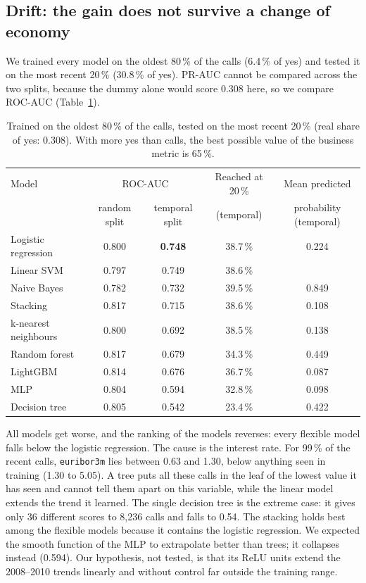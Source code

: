 \documentclass[11pt,a4paper]{article}
\begin{document}
\subsection{Drift: the gain does not survive a change of economy}
We trained every model on the oldest 80\,\% of the calls (6.4\,\% of yes) and tested it on the most recent 20\,\%
(30.8\,\% of yes). PR-AUC cannot be compared across the two splits, because the dummy alone would score 0.308 here,
so we compare ROC-AUC (Table~\ref{tab:temporal}).

\begin{table}[H]
\centering\small
\begin{tabular}{l c c c c}
\toprule
Model & \multicolumn{2}{c}{ROC-AUC} & Reached at 20\,\% & Mean predicted \\
 & random split & temporal split & (temporal) & probability (temporal) \\
\midrule
Logistic regression & 0.800 & \textbf{0.748} & 38.7\,\% & 0.224 \\
Linear SVM & 0.797 & 0.749 & 38.6\,\% & \\
Naive Bayes & 0.782 & 0.732 & 39.5\,\% & 0.849 \\
Stacking & 0.817 & 0.715 & 38.6\,\% & 0.108 \\
k-nearest neighbours & 0.800 & 0.692 & 38.5\,\% & 0.138 \\
Random forest & 0.817 & 0.679 & 34.3\,\% & 0.449 \\
LightGBM & 0.814 & 0.676 & 36.7\,\% & 0.087 \\
MLP & 0.804 & 0.594 & 32.8\,\% & 0.098 \\
Decision tree & 0.805 & 0.542 & 23.4\,\% & 0.422 \\
\bottomrule
\end{tabular}
\caption{Trained on the oldest 80\,\% of the calls, tested on the most recent 20\,\% (real share of yes: 0.308).
With more yes than calls, the best possible value of the business metric is 65\,\%.}
\label{tab:temporal}
\end{table}

All models get worse, and the ranking of the models reverses: every flexible model falls below the logistic
regression. The cause is the interest rate. For 99\,\% of the recent calls, \texttt{euribor3m} lies between 0.63 and
1.30, below anything seen in training (1.30 to 5.05). A tree puts all these calls in the leaf of the lowest value it
has seen and cannot tell them apart on this variable, while the linear model extends the trend it learned. The single
decision tree is the extreme case: it gives only 36 different scores to 8,236 calls and falls to 0.54. The stacking
holds best among the flexible models because it contains the logistic regression. We expected the smooth function of
the MLP to extrapolate better than trees; it collapses instead (0.594). Our hypothesis, not tested, is that its ReLU
units extend the 2008--2010 trends linearly and without control far outside the training range.
\end{document}
